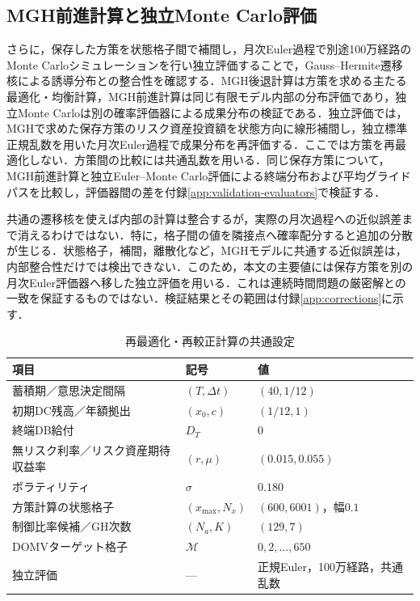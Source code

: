 \documentclass[10pt,a4paper]{article}
\theoremstyle{plain}
\theoremstyle{definition}
\begin{document}
\subsection{MGH前進計算と独立Monte Carlo評価}\label{sec:method-independent}
さらに，保存した方策を状態格子間で補間し，月次Euler過程で別途100万経路のMonte Carloシミュレーションを行い独立評価することで，Gauss--Hermite遷移核による誘導分布との整合性を確認する．MGH後退計算は方策を求める主たる最適化・均衡計算，MGH前進計算は同じ有限モデル内部の分布評価であり，独立Monte Carloは別の確率評価器による成果分布の検証である．独立評価では，MGHで求めた保存方策のリスク資産投資額を状態方向に線形補間し，独立標準正規乱数を用いた月次Euler過程で成果分布を再評価する．ここでは方策を再最適化しない．方策間の比較には共通乱数を用いる．同じ保存方策について，MGH前進計算と独立Euler--Monte Carlo評価による終端分布および平均グライドパスを比較し，評価器間の差を付録\ref{app:validation-evaluators}で検証する．

共通の遷移核を使えば内部の計算は整合するが，実際の月次過程への近似誤差まで消えるわけではない．特に，格子間の値を隣接点へ確率配分すると追加の分散が生じる．状態格子，補間，離散化など，MGHモデルに共通する近似誤差は，内部整合性だけでは検出できない．このため，本文の主要値には保存方策を別の月次Euler評価器へ移した独立評価を用いる．これは連続時間問題の厳密解との一致を保証するものではない．検証結果とその範囲は付録\ref{app:corrections}に示す．

\begin{table}[htbp]
\centering\small
\caption{再最適化・再較正計算の共通設定}
\label{tab:all-strategy-params}
\begin{tabular}{lll}
\toprule
項目 & 記号 & 値 \\
\midrule
蓄積期／意思決定間隔 & $(T,\Delta t)$ & $(40,1/12)$ \\
初期DC残高／年額拠出 & $(x_0,c)$ & $(1/12,1)$ \\
終端DB給付 & $D_T$ & $0$ \\
無リスク利率／リスク資産期待収益率 & $(r,\mu)$ & $(0.015,0.055)$ \\
ボラティリティ & $\sigma$ & $0.180$ \\
方策計算の状態格子 & $(x_{\max},N_x)$ & $(600,6001)$，幅$0.1$ \\
制御比率候補／GH次数 & $(N_a,K)$ & $(129,7)$ \\
DOMVターゲット格子 & $\mathcal M$ & $0,2,\ldots,650$ \\
独立評価 & --- & 正規Euler，100万経路，共通乱数 \\
\bottomrule
\end{tabular}
\end{table}
\end{document}
